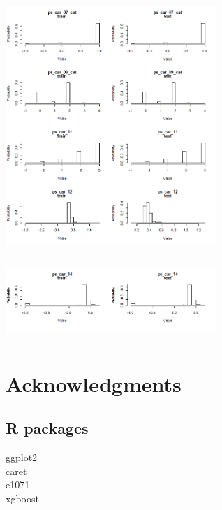 \documentclass[fleqn,10pt]{SelfArx} %
\begin{document}
\includegraphics[width=8cm, height=10cm]{comp_3} \\
\includegraphics[width=8cm, height=3cm]{comp_4} \\

\section*{Acknowledgments} %
\subsection{R packages}


ggplot2\\
caret\\
e1071\\
xgboost






\end{document}
